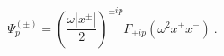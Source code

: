 \begin{equation*}
\Psi _{p}^{\left( \pm \right) }=\left( \frac{\omega |x^{\pm }|}{2}\right)
^{\pm ip}F_{\pm ip}\left( \omega ^{2}x^{+}x^{-}\right) \ .
\end{equation*}


